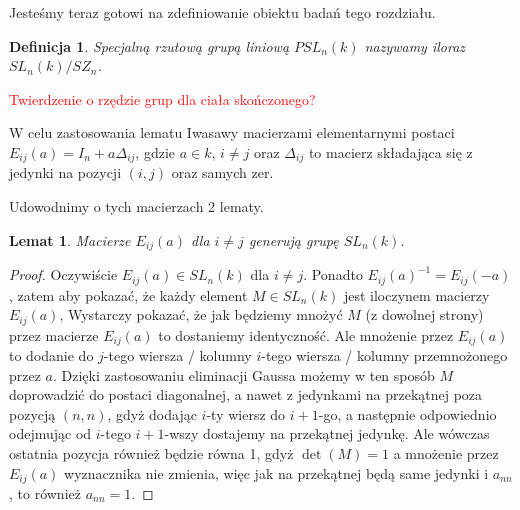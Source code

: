 \documentclass[licencjacka]{pracamgr}
\newtheorem{deff}{Definicja}[section]
\newtheorem{lemma}{Lemat}[section]
\begin{document}
Jesteśmy teraz gotowi na zdefiniowanie obiektu badań tego rozdziału.

\begin{deff}
  \emph{Specjalną rzutową grupą liniową $PSL_n(k)$} nazywamy iloraz $SL_n(k) / SZ_n$.
\end{deff}

\textcolor{red}{Twierdzenie o rzędzie grup dla ciała skończonego?}


W celu zastosowania lematu Iwasawy macierzami elementarnymi postaci
$E_{i j} (a) = I_n + a \Delta_{i j}$, gdzie $a \in k$, $i \ne j$ oraz 
$\Delta_{i j}$ to macierz składająca się z jedynki na pozycji $(i, j)$ oraz samych zer.

Udowodnimy o tych macierzach 2 lematy.

\begin{lemma}
  Macierze $E_{i j}(a)$ dla $i \ne j$ generują grupę $SL_n(k)$.
\end{lemma}
\begin{proof}
  Oczywiście $E_{i j}(a) \in SL_n(k)$ dla $i \ne j$. 
  Ponadto $E_{i j}(a)^{-1} = E_{i j}(-a)$, zatem aby pokazać, że każdy element $M \in SL_n(k)$ jest iloczynem macierzy $E_{i j}(a)$,
  Wystarczy pokazać, że jak będziemy mnożyć $M$ (z dowolnej strony) przez macierze $E_{i j}(a)$ to dostaniemy identyczność.
  Ale mnożenie przez $E_{i j}(a)$ to dodanie do $j$-tego wiersza / kolumny $i$-tego wiersza / kolumny przemnożonego przez $a$.
  Dzięki zastosowaniu eliminacji Gaussa możemy w ten sposób $M$ doprowadzić do postaci diagonalnej,
  a nawet z jedynkami na przekątnej poza pozycją $(n, n)$, gdyż dodając $i$-ty wiersz do $i+1$-go, a następnie odpowiednio
  odejmując od $i$-tego $i+1$-wszy dostajemy na przekątnej jedynkę. Ale wówczas ostatnia pozycja również będzie równa 1, 
  gdyż $\det(M) = 1$ a mnożenie przez $E_{i j}(a)$ wyznacznika nie zmienia, więc jak na przekątnej będą same jedynki i $a_{n n}$,
  to również $a_{n n} = 1$.
\end{proof}
\end{document}
